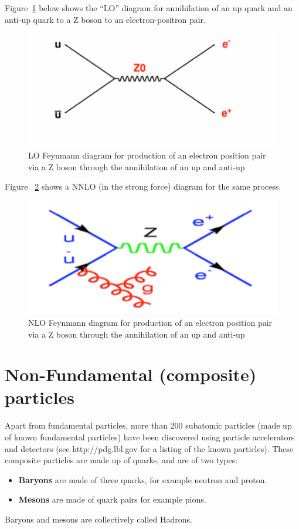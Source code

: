Figure~\ref{fig:fig8} below shows the “LO” diagram for annihilation of an up quark and an anti-up quark to a Z boson to an electron-positron pair.


\begin{figure}[h]
\centering\includegraphics[scale=0.5]{./ElementaryParticles/Pictures/fig8.pdf}
\caption{LO Feynmann diagram for production of an electron position pair via a Z boson through the annihilation of an up and anti-up}
\label{fig:fig8}
\end{figure}
 

Figure ~\ref{fig:fig9} shows a NNLO (in the strong force) diagram for the same process.
 
\begin{figure}[h]
\centering\includegraphics[scale=0.5]{./ElementaryParticles/Pictures/fig9.pdf}
\caption{NLO Feynmann diagram for production of an electron position pair via a Z boson through the annihilation of an up and anti-up}
\label{fig:fig9}
\end{figure}


\section{Non-Fundamental (composite) particles}
Apart from fundamental particles, more than 200 subatomic particles (made up of known fundamental particles) have been discovered using particle accelerators and detectors (see http://pdg.lbl.gov for a listing of the known particles).  These composite particles are made up of quarks, and are of two types:
\begin{itemize}
\item {\bf Baryons} are made of three quarks, for example neutron and proton.
\item {\bf Mesons} are made of quark pairs for example pions.
\end{itemize}
Baryons and mesons are collectively called Hadrons.




